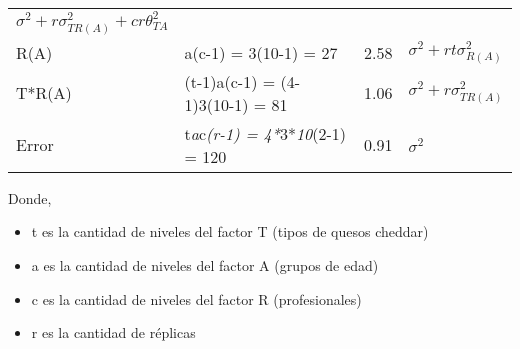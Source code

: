 \documentclass[11pt]{article}
\providecommand{\tightlist}{%
      \setlength{\itemsep}{0pt}\setlength{\parskip}{0pt}}
\begin{document}
\begin{longtable}[]{@{}llll@{}}
\begin{minipage}[t]{0.38\columnwidth}
\(\sigma^2 + r\sigma^2_{TR(A)}+cr\theta_{TA}^2\)\strut
\end{minipage}\tabularnewline
\begin{minipage}[t]{0.20\columnwidth}\raggedright
R(A)\strut
\end{minipage} & \begin{minipage}[t]{0.26\columnwidth}\raggedright
a(c-1) = 3(10-1) = 27\strut
\end{minipage} & \begin{minipage}[t]{0.05\columnwidth}\raggedright
2.58\strut
\end{minipage} & \begin{minipage}[t]{0.38\columnwidth}\raggedright
\(\sigma^2 + rt\sigma^2_{R(A)}\)\strut
\end{minipage}\tabularnewline
\begin{minipage}[t]{0.20\columnwidth}\raggedright
T*R(A)\strut
\end{minipage} & \begin{minipage}[t]{0.29\columnwidth}\raggedright
(t-1)a(c-1) = (4-1)3(10-1) = 81\strut
\end{minipage} & \begin{minipage}[t]{0.05\columnwidth}\raggedright
1.06\strut
\end{minipage} & \begin{minipage}[t]{0.38\columnwidth}\raggedright
\(\sigma^2 + r\sigma^2_{TR(A)}\)\strut
\end{minipage}\tabularnewline
\begin{minipage}[t]{0.20\columnwidth}\raggedright
Error\strut
\end{minipage} & \begin{minipage}[t]{0.32\columnwidth}\raggedright
t\emph{a}c\emph{(r-1) = 4*}3*\emph{10}(2-1) = 120\strut
\end{minipage} & \begin{minipage}[t]{0.05\columnwidth}\raggedright
0.91\strut
\end{minipage} & \begin{minipage}[t]{0.38\columnwidth}\raggedright
\(\sigma^2\)\strut
\end{minipage}\tabularnewline
\bottomrule
\end{longtable}

Donde,

\begin{itemize}
\tightlist
\item
  t es la cantidad de niveles del factor T (tipos de quesos cheddar)
\item
  a es la cantidad de niveles del factor A (grupos de edad)
\item
  c es la cantidad de niveles del factor R (profesionales)
\item
  r es la cantidad de réplicas
\end{itemize}
\end{document}
